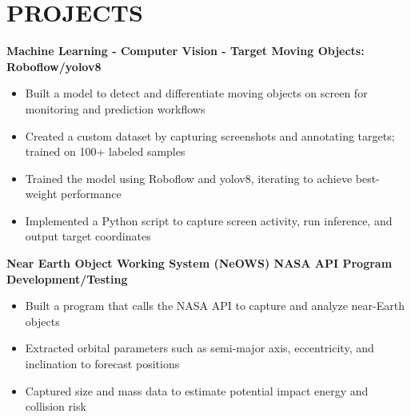 \documentclass[10pt,letterpaper]{article}
\newcommand{\resumeItem}[1]{\item {#1}}
\begin{document}
\section*{PROJECTS}
\textbf{Machine Learning - Computer Vision - Target Moving Objects: Roboflow/yolov8}
\begin{itemize}
    \resumeItem{Built a model to detect and differentiate moving objects on screen for monitoring and prediction workflows}
    \resumeItem{Created a custom dataset by capturing screenshots and annotating targets; trained on 100+ labeled samples}
    \resumeItem{Trained the model using Roboflow and yolov8, iterating to achieve best-weight performance}
    \resumeItem{Implemented a Python script to capture screen activity, run inference, and output target coordinates}
\end{itemize}

\textbf{Near Earth Object Working System (NeOWS) NASA API Program Development/Testing}
\begin{itemize}
    \resumeItem{Built a program that calls the NASA API to capture and analyze near-Earth objects}
    \resumeItem{Extracted orbital parameters such as semi-major axis, eccentricity, and inclination to forecast positions}
    \resumeItem{Captured size and mass data to estimate potential impact energy and collision risk}
\end{itemize}
\end{document}
